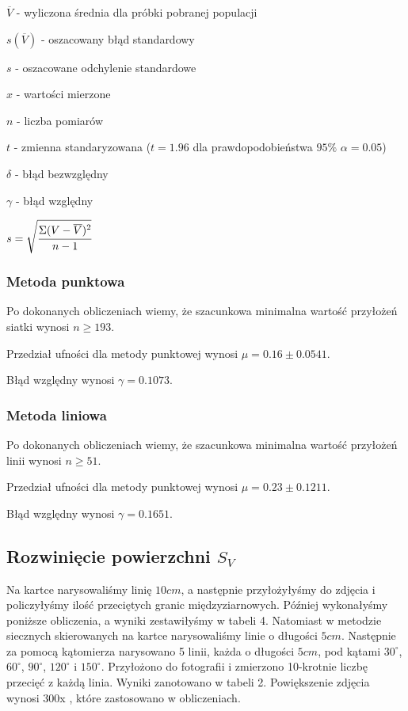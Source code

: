 \documentclass[a4paper,12pt]{article}
\begin{document}
$\overline{V}$ - wyliczona średnia dla próbki pobranej populacji

$s(\overline{V})$ - oszacowany błąd standardowy

$s$ - oszacowane odchylenie standardowe

$x$ - wartości mierzone 

$n$ - liczba pomiarów

$t$ - zmienna standaryzowana ($t=1.96$ dla prawdopodobieństwa $95\%$ $\alpha=0.05$)

$\delta$ - błąd bezwzględny

$\gamma$ - błąd względny

$s=\sqrt{\cfrac{\Sigma (V-\overline{V})^2}{n-1}}$

\subsubsection{Metoda punktowa}

Po dokonanych obliczeniach wiemy, że szacunkowa minimalna wartość przyłożeń siatki wynosi $n\ge 193$.



Przedział ufności dla metody punktowej wynosi $\mu=0.16\pm 0.0541$.

Błąd względny wynosi $\gamma=0.1073$.

\subsubsection{Metoda liniowa}

Po dokonanych obliczeniach wiemy, że szacunkowa minimalna wartość przyłożeń linii wynosi $n\ge 51$.



Przedział ufności dla metody punktowej wynosi $\mu=0.23\pm 0.1211$.

Błąd względny wynosi $\gamma=0.1651$.


\subsection{Rozwinięcie powierzchni $S_V$}

Na kartce narysowaliśmy linię $10cm$, a następnie przyłożyłyśmy do zdjęcia i policzyłyśmy ilość przeciętych granic międzyziarnowych. Później wykonałyśmy poniższe obliczenia, a wyniki zestawiłyśmy w tabeli 4.  Natomiast w metodzie siecznych skierowanych na kartce narysowaliśmy linie o długości $5cm$. Następnie za pomocą kątomierza narysowano 5 linii, każda o długości $5cm$, pod kątami $30^\circ$, $60^\circ$, $90^\circ$, $120^\circ$ i $150^\circ$. Przyłożono do fotografii i zmierzono 10-krotnie liczbę przecięć z każdą linia. Wyniki zanotowano w tabeli 2.
Powiększenie zdjęcia  wynosi 300x , które zastosowano w obliczeniach.
\newline
\end{document}
